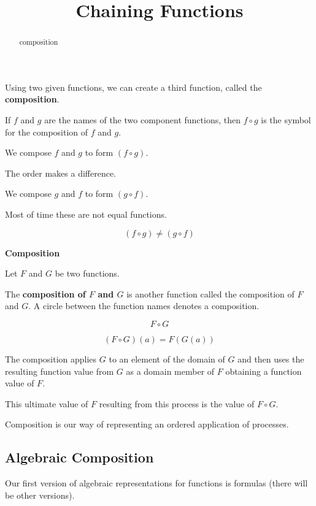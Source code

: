 \documentclass{ximera}
\title{Chaining Functions}
\begin{document}
\begin{abstract}
composition
\end{abstract}
\maketitle





Using two given functions, we can create a third function, called the \textbf{composition}.

If $f$ and $g$ are the names of the two component functions, then $f \circ g$ is the symbol for the composition of $f$ and $g$.

We compose $f$ and $g$ to form $(f \circ g)$.

The order makes a difference.

We compose $g$ and $f$ to form $(g \circ f)$.


Most of time these are not equal functions.

\[
(f \circ g) \ne (g \circ f)
\]


\begin{idea} \textbf{\textcolor{blue!55!black}{Composition}}


Let $F$ and $G$ be two functions.

The \textbf{composition of $F$ and $G$} is another function called the composition of $F$ and $G$.  A circle between the function names denotes a composition.

\[
F \circ G
\]


\[
(F \circ G)(a) = F(G(a))
\]


The composition applies $G$ to an element of the domain of $G$ and then uses the resulting function value from $G$ as a domain member of $F$ obtaining a function value of $F$.

This ultimate value of $F$ resulting from this process is the value of $F \circ G$.

\end{idea}



Composition is our way of representing an ordered application of processes.



\subsection*{Algebraic Composition}


Our first version of algebraic representations for functions is formulas (there will be other versions).
\end{document}
